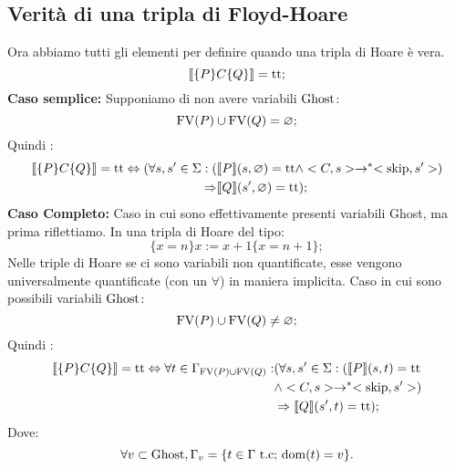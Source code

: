 \subsection{Verità di una tripla di Floyd-Hoare}
Ora abbiamo tutti gli elementi per definire quando una tripla di Hoare è vera.
$$\llbracket \{P\}C\{Q\} \rrbracket = \mathrm{tt};$$
\textbf{Caso semplice: }Supponiamo di non avere variabili $\mathrm{Ghost}$:
$$\mathrm{FV}(P) \cup \mathrm{FV}(Q)= \varnothing;$$
Quindi :
\begin{align*}
   \llbracket \{P\} C\{Q\} \rrbracket = \mathrm{tt} \Leftrightarrow (\forall s,s'\in \Sigma \mathrel{:}(
      &\llbracket P \rrbracket( s,\varnothing) = \mathrm{tt}\wedge <C,s>\rightarrow ^*<\mathrm{skip},s'>)\\
      \Rightarrow&\llbracket Q \rrbracket(s',\varnothing)=\mathrm{tt});
\end{align*}
\textbf{Caso Completo: }Caso in cui sono effettivamente presenti variabili Ghost, ma prima riflettiamo. In una tripla di Hoare del tipo:
$$\{x=n\}x:=x+1\{x=n+1\};$$
Nelle triple di Hoare se ci sono variabili non quantificate, esse vengono universalmente quantificate (con un $\forall$) in maniera implicita. Caso in cui sono possibili variabili $\mathrm{Ghost}$:
$$\mathrm{FV}(P) \cup \mathrm{FV}(Q) \neq \varnothing;$$
Quindi :
\begin{align*}
    \llbracket \{P\} C\{Q\} \rrbracket = \mathrm{tt} \Leftrightarrow \forall t \in \Gamma_{\mathrm{FV}(P)\cup \mathrm{FV}(Q)}\mathrel{:} 
       &(\forall  s,s'\in \Sigma\mathrel{:}(\llbracket P \rrbracket(s,t) = \mathrm{tt}\\
       &\wedge <C,s>\rightarrow ^*<\mathrm{skip},s'>)\\
       &\Rightarrow\llbracket Q \rrbracket(s',t)=\mathrm{tt});
\end{align*}
Dove:
$$\forall v \subset\mathrm{Ghost},\Gamma_{v} =\{t \in \Gamma \text{ t.c; $\mathop{\mathrm{dom}}\nolimits(t) =v$\}}.$$
